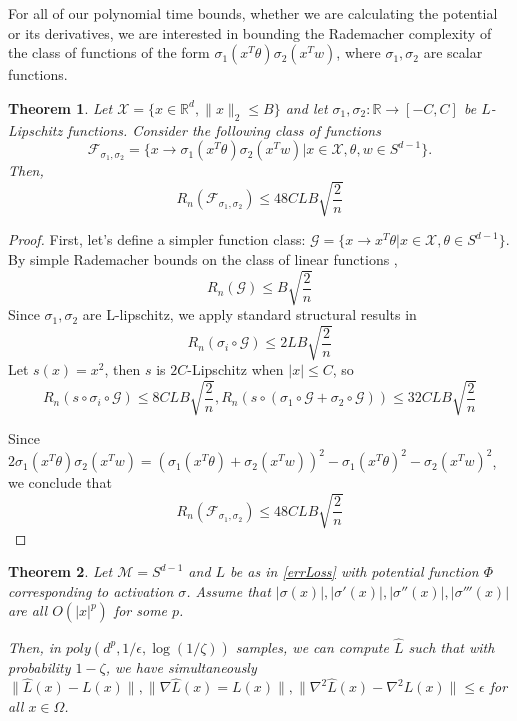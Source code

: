 \documentclass{article}
\newtheorem{theorem}{Theorem}[section]
\newcommand{\R}{{\mathbb{R}}}
\begin{document}
For all of our polynomial time bounds, whether we are calculating the potential or its derivatives, we are interested in bounding the Rademacher complexity of the class of functions of the form $\sigma_1(x^T\theta) \sigma_2(x^Tw)$, where $\sigma_1,\sigma_2$ are scalar functions.
%
\begin{theorem}
Let $\mathcal{X} = \{x \in \R^d, \|x\|_2\leq B\}$ and let $\sigma_1,\sigma_2 : \R \to [-C,C]$ be $L$-Lipschitz functions. Consider the following class of functions
%
\[\mathcal{F}_{\sigma_1,\sigma_2} = \{x\to\sigma_1(x^T\theta) \sigma_2(x^Tw) | x\in\mathcal{X}, \theta, w \in S^{d-1}\}.\]
Then, \[R_n(\mathcal{F}_{\sigma_1,\sigma_2}) \leq 48CLB\sqrt{\frac{2}{n}}\]
\end{theorem}
\begin{proof}
First, let's define a simpler function class: $\mathcal{G} = \{x\to x^T\theta  | x\in\mathcal{X}, \theta \in S^{d-1}\}$. By simple Rademacher bounds on the class of linear functions \cite{kakade2009complexity}, 
 \[R_n(\mathcal{G}) \leq B\sqrt{\frac{2}{n}}\]
%
Since $\sigma_1,\sigma_2$ are L-lipschitz, we apply standard structural results in \cite{bartlett2002rademacher}
%
\[R_n(\sigma_i\circ \mathcal{G}) \leq 2LB\sqrt{\frac{2}{n}}\]
%
Let $s(x) = x^2$, then $s$ is $2C$-Lipschitz when $|x|\leq C$, so 
%
\[R_n(s\circ \sigma_i\circ\mathcal{G}) \leq 8CLB\sqrt{\frac{2}{n}},
R_n(s\circ(\sigma_1\circ \mathcal{G} +\sigma_2\circ \mathcal{G})) \leq
32 CLB\sqrt{\frac{2}{n}}\]
 
Since $2\sigma_1(x^T\theta)\sigma_2(x^Tw) = (\sigma_1(x^T\theta)+\sigma_2(x^Tw))^2 - \sigma_1(x^T\theta)^2 - \sigma_2(x^Tw)^2$, we conclude that 
\[R_n (\mathcal{F}_{\sigma_1,\sigma_2}) \leq 48CLB\sqrt{\frac{2}{n}}\]
\end{proof}

\begin{theorem}
\label{genErrBound}
Let $\mathcal{M} = S^{d-1}$ and $L$ be as in \ref{errLoss} with potential function $\Phi$ corresponding to activation $\sigma$. Assume that $|\sigma(x)|, |\sigma'(x)|,|\sigma''(x)|, |\sigma'''(x)|$ are all $O(|x|^p)$ for some $p$.  

Then, in $poly(d^p,1/\epsilon, \log(1/\zeta))$ samples, we can compute $\hat{L}$ such that with probability $1-\zeta$, we have simultaneously $\|\widehat{L}(x) -L(x)\|, \|\nabla \widehat{L}(x) = L(x)\|, \|\nabla^2\widehat{L}(x) -\nabla^2 L(x)\| \leq \epsilon$ for all $x\in \Omega$.
\end{theorem}
\end{document}
